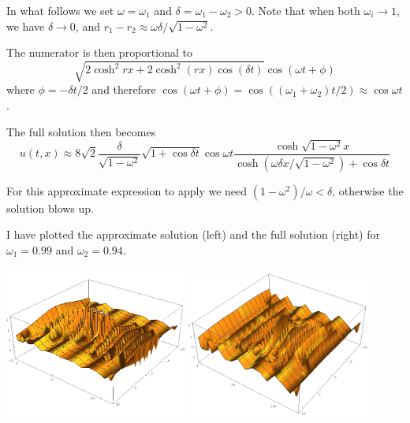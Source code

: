 \documentclass{report}
\begin{document}
In what follows we set $\omega=\omega_1$ and $\delta=\omega_1-\omega_2>0$. Note that when both $\omega_i\to1$, we have $\delta\to0$, and $r_1-r_2\approx \omega \delta/\sqrt{1-\omega^2}$.

The numerator is then proportional to
\begin{equation}
  \sqrt{2\cosh^2 rx + 2\cosh^2 (rx) \cos(\delta t)}\cos(\omega t+\phi)
\end{equation}
where $\phi = -\delta t/2$ and therefore $\cos(\omega t+\phi)=\cos((\omega_1+\omega_2)t/2)\approx\cos\omega t$.

The full solution then becomes
\begin{equation}
  u(t,x) \approx 8\sqrt{2}  \frac{\delta}{\sqrt{1-\omega^2}} \sqrt{1+\cos\delta t} \cos\omega t \frac{\cosh \sqrt{1-\omega^2} x}{\cosh(\omega\delta x/\sqrt{1-\omega^2}) + \cos \delta t}
\end{equation}

For this approximate expression to apply we need $(1-\omega^2)/\omega < \delta$, otherwise the solution blows up.

I have plotted the approximate solution (left) and the full solution (right) for $\omega_1=0.99$ and $\omega_2=0.94$.

\begin{center}
  \includegraphics[width=6cm]{plot/small-approx.png}
  \includegraphics[width=6cm]{plot/small-full.png}
\end{center}
\end{document}
